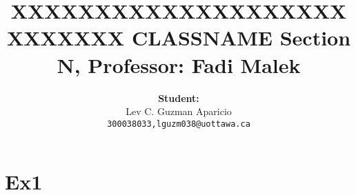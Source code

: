 \documentclass[16pt, lettersize]{article}
\title{XXXXXXXXXXXXXXXXXXXXXXXXXXX \newline \newline
	  \large \textbf{ CLASSNAME Section N, Professor: Fadi Malek} }
\author{\Large \textbf{Student:} \\ Lev C. Guzman Aparicio \\ 
		\texttt{300038033,lguzm038@uottawa.ca}}
\begin{document}
	\maketitle
	
	\section{Ex1}
	
\end{document}

